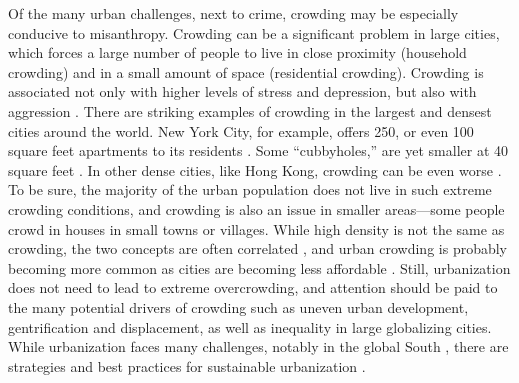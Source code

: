 \documentclass[11pt, letterpaper]{article}
\begin{document}
\begin{spacing}{1.4}
%
Of the many urban challenges, next to crime, crowding may be especially conducive to misanthropy.  
Crowding can be a significant problem in large cities, which forces a large number of people to live in close proximity (household crowding) and in a small amount of space (residential crowding). Crowding is associated not only with higher levels of stress and depression, but also with aggression \citep{regoeczi2008,calhoun62}. 
There are striking examples of crowding in the largest and densest cities around
the world. New York City, for example, offers 250, or even 100 square feet apartments to its residents
\citep{abc,yoneda,dailynews}. Some ``cubbyholes,'' are yet smaller at 40 square feet \citep{newyorktimes}. In other dense cities, like Hong Kong, crowding can be even worse \citep{newyorktimes2}. To be sure, the majority of the urban population does not live in such extreme crowding conditions, and crowding is also an issue in smaller areas---some people crowd in houses in small towns or villages.
  While high density is not the same as crowding, the two concepts are often
  correlated \citep{meyer13}, and urban crowding is probably becoming more
  common  as cities are becoming less affordable  \citep[e.g.,][]{misraCL15oct6,floridaCL18apr11,weinbergCL16aug11,solariMISC19apr24,schuetzMISC19may7,kotkin_db_mar20_13}. 
%    
 Still, urbanization does not need to lead to extreme overcrowding, and attention should be
 paid to the many potential drivers of crowding such as uneven urban
  development, gentrification and displacement, as well as inequality in large
  globalizing cities.
  While urbanization faces many challenges, notably in the global South \citep{hong21}, 
  there are strategies and best practices for sustainable urbanization \citep{bauduceau2015towards, world2016urban,ochoa2018learning,tan2016sustainable}.

% 




\end{spacing}
\end{document}
